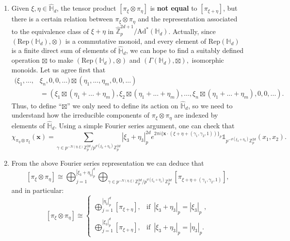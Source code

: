 \documentclass[12pt, reqno]{amsart}
\newcommand{\Z}{\mathbb{Z}}
\newcommand{\1}{\mathds{1}}
\begin{document}
\begin{enumerate}
    \item Given $ \xi, \eta \in \widehat{\mathbb{H}}_d$, the tensor product $[\pi_\xi \otimes \pi_\eta]$ is \textbf{not equal} to $[\pi_{\xi + \eta}]$, but there is a certain relation between $\pi_\xi \otimes \pi_\eta$ and the representation associated to the equivalence class of $\xi + \eta$ in $\widehat{\Z}_p^{2d+1}/ \mathrm{Ad}^* (\mathbb{H}_d)$. Actually, since $(\mathrm{Rep}(\mathbb{H}_d), \otimes)$ is a commutative monoid, and every element of $\mathrm{Rep}(\mathbb{H}_d)$ is a finite direct sum of elements of $\widehat{\mathbb{H}}_d$, we can hope to find a suitably defined  operation $\boxtimes$ to make $(\mathrm{Rep}(\mathbb{H}_d), \otimes)$ and $(\Gamma(\mathbb{H}_d) , \boxtimes),$ isomorphic monoids. Let us agree first that \begin{align*}
        (\xi_1,...,&\xi_n,0,0,...) \boxtimes (\eta_1,...,\eta_m,0,0,...) \\ &=(\xi_1 \boxtimes(\eta_1+...+\eta_m) , \xi_2  \boxtimes(\eta_1+...+\eta_m),..., \xi_n \boxtimes(\eta_1+...+\eta_m),0,0,... ).
    \end{align*}Thus, to define “$\boxtimes$” we only need to define its action on $\widehat{\mathbb{H}}_d$, so we need to understand how the irreducible components of $\pi_\xi \otimes \pi_\eta$ are indexed by elements of $\widehat{\mathbb{H}}_d$. Using a simple Fourier series argument, one can check that
    \[
    \chi_{\pi_\eta \otimes \pi_\xi}(\mathbf{x}) = \sum_{\gamma \in p^{-N(\eta, \xi)} \mathbb{Z}_p^{2d} / p^{\vartheta(\xi_3+\eta_3)} \mathbb{Z}_p^{2d}}
    |\xi_3 + \eta_3|_p^{2d} e^{2\pi i \{ \mathbf{x} \cdot (\xi + \eta + (\gamma_1, \gamma_2, 1)) \}_p} \mathbb{1}_{p^{-\vartheta(\xi_3+\eta_3)} \mathbb{Z}_p^{2d}} (x_1, x_2).
    \]
    \item From the above Fourier series representation we can deduce that  $$[\pi_\xi \otimes \pi_\eta ] \cong \bigoplus_{j=1}^{| \xi_3 + \eta_3 |_p^d} \bigoplus_{\gamma \in p^{-N(\eta, \xi)} \mathbb{Z}_p^{2d} / p^{\vartheta(\xi_3+\eta_3)} \mathbb{Z}_p^{2d}}  [\pi_{\xi +  \eta + (\gamma_1 , \gamma_2, 1)}],  $$and in particular: \[
[\pi_\xi \otimes \pi_\eta ] \cong 
\begin{cases}
\bigoplus_{j=1}^{| \eta_3 |_p^d} [\pi_{\xi + \eta } ] , & \text{if } \, |\xi_3 + \eta_3|_p = |\xi_3|_p \, \,, \\
\bigoplus_{j=1}^{| \xi_3 |_p^d} [\pi_{\xi + \eta } ] , & \text{if } \, |\xi_3 + \eta_3|_p = |\eta_3|_p .
\end{cases}
\]    
\end{enumerate}
\end{document}
